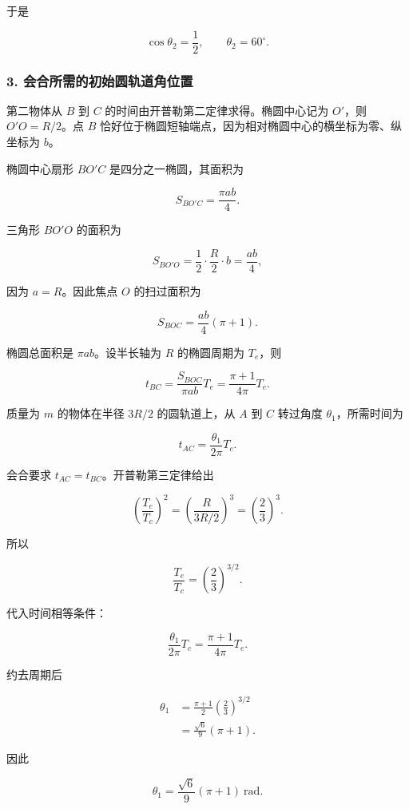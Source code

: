 \documentclass[12pt,a4paper,UTF8]{ctexart}
\begin{document}
于是

\[
\cos\theta_2=\frac12,
\qquad
\boxed{\theta_2=60^\circ}.
\]

\subsubsection{3.
会合所需的初始圆轨道角位置}\label{ux4f1aux5408ux6240ux9700ux7684ux521dux59cbux5706ux8f68ux9053ux89d2ux4f4dux7f6e}

第二物体从 \(B\) 到 \(C\) 的时间由开普勒第二定律求得。椭圆中心记为
\(O'\)，则 \(O'O=R/2\)。点 \(B\)
恰好位于椭圆短轴端点，因为相对椭圆中心的横坐标为零、纵坐标为 \(b\)。

椭圆中心扇形 \(BO'C\) 是四分之一椭圆，其面积为

\[
S_{BO'C}=\frac{\pi ab}{4}.
\]

三角形 \(BO'O\) 的面积为

\[
S_{BO'O}=\frac12\cdot\frac{R}{2}\cdot b
=\frac{ab}{4},
\]

因为 \(a=R\)。因此焦点 \(O\) 的扫过面积为

\[
S_{BOC}=\frac{ab}{4}(\pi+1).
\]

椭圆总面积是 \(\pi ab\)。设半长轴为 \(R\) 的椭圆周期为 \(T_e\)，则

\[
t_{BC}=\frac{S_{BOC}}{\pi ab}T_e
=\frac{\pi+1}{4\pi}T_e.
\]

质量为 \(m\) 的物体在半径 \(3R/2\) 的圆轨道上，从 \(A\) 到 \(C\)
转过角度 \(\theta_1\)，所需时间为

\[
t_{AC}=\frac{\theta_1}{2\pi}T_c.
\]

会合要求 \(t_{AC}=t_{BC}\)。开普勒第三定律给出

\[
\left(\frac{T_e}{T_c}\right)^2
=\left(\frac{R}{3R/2}\right)^3
=\left(\frac23\right)^3.
\]

所以

\[
\frac{T_e}{T_c}=\left(\frac23\right)^{3/2}.
\]

代入时间相等条件：

\[
\frac{\theta_1}{2\pi}T_c
=\frac{\pi+1}{4\pi}T_e.
\]

约去周期后

\[
\begin{aligned}
\theta_1
&=\frac{\pi+1}{2}\left(\frac23\right)^{3/2}\\
&=\frac{\sqrt6}{9}(\pi+1).
\end{aligned}
\]

因此

\[
\boxed{\theta_1=\frac{\sqrt6}{9}(\pi+1)\ \mathrm{rad}}.
\]
\end{document}
